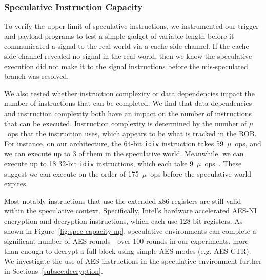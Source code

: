 
\subsubsection{Speculative Instruction Capacity}

To verify the upper limit of speculative instructions, we instrumented our
trigger and payload programs to test a simple gadget of variable-length before it
communicated a signal to the real world via a cache side channel. If the cache
side channel revealed no signal in the real world, then we know the speculative
execution did not make it to the signal instructions before the mis-speculated
branch was resolved.

We also tested whether instruction complexity or data dependencies impact the
number of instructions that can be completed. We find that data dependencies and
instruction complexity both have an impact on the number of instructions that
can be executed. Instruction complexity is determined by the number of $\mu$~ops
that the instruction uses, which appears to be what is tracked in the ROB. For
instance, on our architecture, the 64-bit \texttt{idiv} instruction takes 59~$\mu$~ops,
and we can execute up to 3 of them in the speculative world.
Meanwhile, we can execute up to 18 32-bit \texttt{idiv} instructions, which each
take 9~$\mu$~ops~\cite{intel-instruction-tables}. These suggest we can execute
on the order of 175~$\mu$~ops before the speculative world expires.

% 

Most notably instructions that use the extended x86 registers are still valid
within the speculative context. Specifically, Intel's hardware accelerated
AES-NI encryption and decryption instructions, which each use 128-bit registers.
As shown in Figure~\ref{fig:spec-capacity-np}, speculative environments can
complete a significant number of AES rounds---over 100 rounds in our
experiments, more than enough to decrypt a
full block using simple AES modes (e.g. AES-CTR). We investigate the use of AES
instructions in the speculative environment further in
Sections~\ref{subsec:decryption}.


